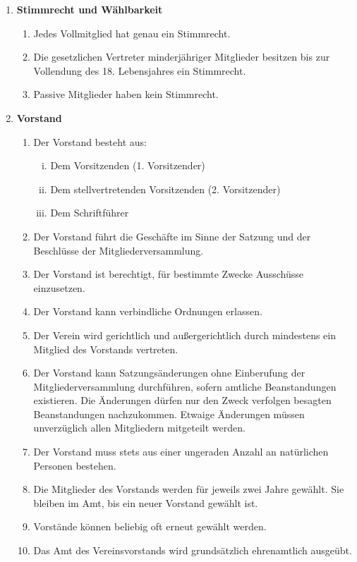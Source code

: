 \documentclass[a4paper,11pt]{article}
\begin{document}
\begin{enumerate}[§ 1.]
\item \textsf{\textbf{Stimmrecht und Wählbarkeit}}

\begin{enumerate}[1.]
\item Jedes Vollmitglied hat genau ein Stimmrecht.
\item Die gesetzlichen Vertreter minderjähriger Mitglieder besitzen bis zur Vollendung des 18.
Lebensjahres ein Stimmrecht.
\item Passive Mitglieder haben kein Stimmrecht.
\end{enumerate}

\item \textsf{\textbf{Vorstand}}

\begin{enumerate}[1.]
\item Der Vorstand besteht aus:
\begin{enumerate}[i)]
\item Dem Vorsitzenden (1. Vorsitzender)
\item Dem stellvertretenden Vorsitzenden (2. Vorsitzender)
\item Dem Schriftführer
\end{enumerate}
\item Der Vorstand führt die Geschäfte im Sinne der Satzung und der Beschlüsse der Mitgliederversammlung.
\item Der Vorstand ist berechtigt, für bestimmte Zwecke Ausschüsse einzusetzen.
\item Der Vorstand kann verbindliche Ordnungen erlassen.
\item Der Verein wird gerichtlich und außergerichtlich durch mindestens ein Mitglied des Vorstands vertreten.
\item Der Vorstand kann Satzungsänderungen ohne Einberufung der Mitgliederversammlung
durchführen, sofern amtliche Beanstandungen existieren. Die Änderungen dürfen nur den Zweck verfolgen besagten Beanstandungen nachzukommen. Etwaige Änderungen müssen unverzüglich allen Mitgliedern mitgeteilt werden.
\item Der Vorstand muss stets aus einer ungeraden Anzahl an natürlichen Personen bestehen.
\item Die Mitglieder des Vorstands werden für jeweils zwei Jahre gewählt. Sie bleiben im Amt, bis ein neuer Vorstand gewählt ist.
\item Vorstände können beliebig oft erneut gewählt werden.
\item Das Amt des Vereinsvorstands wird grundsätzlich ehrenamtlich ausgeübt.

\end{enumerate}
\end{enumerate}
\end{document}
